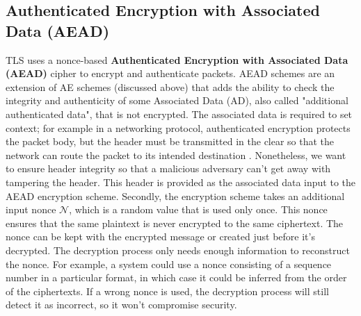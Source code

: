 \subsection{Authenticated Encryption with Associated Data (AEAD)}
TLS uses a nonce-based \textbf{Authenticated Encryption with Associated Data (AEAD)} \cite{aead} cipher to encrypt and authenticate packets. AEAD schemes are an extension of AE schemes (discussed above) that adds the ability to check the integrity and authenticity of some Associated Data (AD), also called "additional authenticated data", that is not encrypted. The associated data is required to set context; for example in a networking protocol, authenticated encryption protects the packet body, but the header must be transmitted in the clear so that the network can route the packet to its intended destination \cite{gradcourse}. Nonetheless, we want to ensure header integrity so that a malicious adversary can't get away with tampering the header. This header is provided as the associated data input to the AEAD encryption scheme. Secondly, the encryption scheme takes an additional input nonce $\mathcal{N}$, which is a random value that is used only once. This nonce ensures that the same plaintext is never encrypted to the same ciphertext. The nonce can be kept with the encrypted message or created just before it's decrypted. The decryption process only needs enough information to reconstruct the nonce. For example, a system could use a nonce consisting of a sequence number in a particular format, in which case it could be inferred from the order of the ciphertexts. If a wrong nonce is used, the decryption process will still detect it as incorrect, so it won't compromise security.

